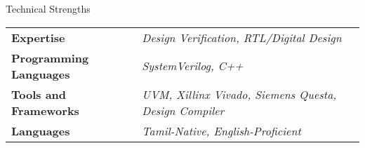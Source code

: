 \documentclass[
	11pt, %
]{./../assets/resume} %
\begin{document}
	




\begin{rSection}{Technical Strengths}

	\def\arraystretch{1.5}

	\begin{tabular}{ l l}
		\textbf{Expertise} & \emph{Design Verification, RTL/Digital Design} \\
		\textbf{Programming Languages} & \emph{SystemVerilog, C++} \\
		\textbf{Tools and Frameworks} & \emph{UVM, Xillinx Vivado, Siemens Questa, Design Compiler} \\ 
		\textbf{Languages} & \emph{Tamil-Native, English-Proficient} \\
	\end{tabular}

\end{rSection}

\end{document}
